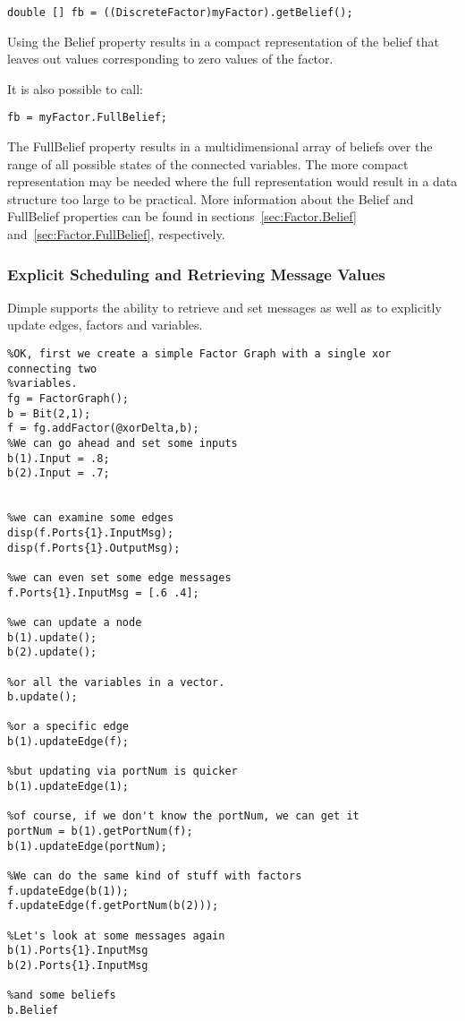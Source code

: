 \ifjava
\begin{lstlisting}
double [] fb = ((DiscreteFactor)myFactor).getBelief();
\end{lstlisting}

\fi

Using the Belief property results in a compact representation of the belief that leaves out values corresponding to zero values of the factor.  

\ifmatlab

It is also possible to call:

\begin{lstlisting}
fb = myFactor.FullBelief;
\end{lstlisting}

The FullBelief property results in a multidimensional array of beliefs over the range of all possible states of the connected variables.  The more compact representation may be needed where the full representation would result in a data structure too large to be practical.  More information about the Belief and FullBelief properties can be found in sections~\ref{sec:Factor.Belief} and~\ref{sec:Factor.FullBelief}, respectively.
\fi
 
\subsubsection{Explicit Scheduling and Retrieving Message Values}

Dimple supports the ability to retrieve and set messages as well as to explicitly update edges, factors and variables.

\ifmatlab
\begin{lstlisting}
%OK, first we create a simple Factor Graph with a single xor connecting two  
%variables.
fg = FactorGraph(); 
b = Bit(2,1);
f = fg.addFactor(@xorDelta,b);
%We can go ahead and set some inputs
b(1).Input = .8;
b(2).Input = .7;


%we can examine some edges 
disp(f.Ports{1}.InputMsg);
disp(f.Ports{1}.OutputMsg);

%we can even set some edge messages
f.Ports{1}.InputMsg = [.6 .4];

%we can update a node 
b(1).update();
b(2).update();

%or all the variables in a vector.
b.update();

%or a specific edge
b(1).updateEdge(f);
 
%but updating via portNum is quicker
b(1).updateEdge(1);

%of course, if we don't know the portNum, we can get it
portNum = b(1).getPortNum(f);
b(1).updateEdge(portNum);

%We can do the same kind of stuff with factors
f.updateEdge(b(1));
f.updateEdge(f.getPortNum(b(2)));

%Let's look at some messages again
b(1).Ports{1}.InputMsg
b(2).Ports{1}.InputMsg

%and some beliefs
b.Belief
\end{lstlisting}
\fi

